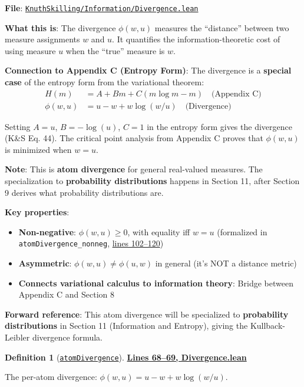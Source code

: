 \documentclass[11pt]{article}
\theoremstyle{definition}
\newtheorem{definition}[theorem]{Definition}
\theoremstyle{remark}
\begin{document}
\textbf{File}: \href{https://github.com/zariuq/ks-foundations-of-inference/blob/main/KnuthSkilling/Information/Divergence.lean}{\texttt{KnuthSkilling/Information/Divergence.lean}}

\textbf{What this is}: The divergence $\phi(w, u)$ measures the ``distance'' between two measure assignments $w$ and $u$. It quantifies the information-theoretic cost of using measure $u$ when the ``true'' measure is $w$.

\textbf{Connection to Appendix C (Entropy Form)}: The divergence is a \textbf{special case} of the entropy form from the variational theorem:
\begin{align*}
H(m) &= A + Bm + C(m \log m - m) \quad \text{(Appendix C)} \\
\phi(w, u) &= u - w + w \log(w/u) \quad \text{(Divergence)}
\end{align*}

Setting $A = u$, $B = -\log(u)$, $C = 1$ in the entropy form gives the divergence (K\&S Eq. 44). The critical point analysis from Appendix C proves that $\phi(w, u)$ is minimized when $w = u$.

\textbf{Note}: This is \textbf{atom divergence} for general real-valued measures. The specialization to \textbf{probability distributions} happens in Section 11, after Section 9 derives what probability distributions are.

\textbf{Key properties}:
\begin{itemize}
\item \textbf{Non-negative}: $\phi(w, u) \geq 0$, with equality iff $w = u$ (formalized in \texttt{atomDivergence\_nonneg}, \href{https://github.com/zariuq/ks-foundations-of-inference/blob/main/KnuthSkilling/Information/Divergence.lean\#L102-L120}{lines 102--120})
\item \textbf{Asymmetric}: $\phi(w, u) \neq \phi(u, w)$ in general (it's NOT a distance metric)
\item \textbf{Connects variational calculus to information theory}: Bridge between Appendix C and Section 8
\end{itemize}

\textbf{Forward reference}: This atom divergence will be specialized to \textbf{probability distributions} in Section 11 (Information and Entropy), giving the Kullback-Leibler divergence formula.

\begin{definition}[\href{https://github.com/zariuq/ks-foundations-of-inference/blob/main/KnuthSkilling/Information/Divergence.lean\#L68}{\texttt{atomDivergence}}]
\textbf{\href{https://github.com/zariuq/ks-foundations-of-inference/blob/main/KnuthSkilling/Information/Divergence.lean\#L68-L69}{Lines 68--69, Divergence.lean}}

The per-atom divergence: $\phi(w, u) = u - w + w \log(w/u)$.
\end{definition}
\end{document}
